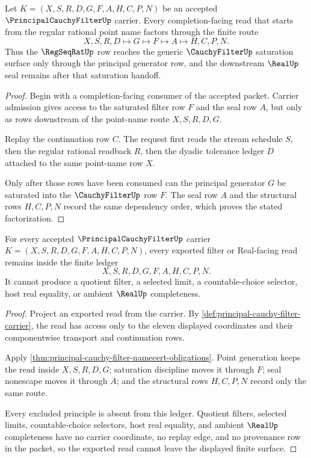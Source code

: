 \begin{theorem}
\label{thm:principal-cauchy-filter-regseqrat-handoff}
Let $K=(X,S,R,D,G,F,A,H,C,P,N)$ be an accepted $\PrincipalCauchyFilterUp$ carrier. Every completion-facing read that starts from the regular rational point name factors through the finite route
$$
X,S,R,D \longmapsto G \longmapsto F \longmapsto A \longmapsto H,C,P,N .
$$
Thus the $\RegSeqRatUp$ row reaches the generic $\CauchyFilterUp$ saturation surface only through the principal generator row, and the downstream $\RealUp$ seal remains after that saturation handoff.
\end{theorem}
\begin{proof}
Begin with a completion-facing consumer of the accepted packet. Carrier admission gives access to the saturated filter row $F$ and the seal row $A$, but only as rows downstream of the point-name route $X,S,R,D,G$.

Replay the continuation row $C$. The request first reads the stream schedule $S$, then the regular rational readback $R$, then the dyadic tolerance ledger $D$ attached to the same point-name row $X$.

Only after those rows have been consumed can the principal generator $G$ be saturated into the $\CauchyFilterUp$ row $F$. The seal row $A$ and the structural rows $H,C,P,N$ record the same dependency order, which proves the stated factorization.
\end{proof}

\begin{theorem}
\label{thm:principal-cauchy-filter-ledger-non-escape}
For every accepted $\PrincipalCauchyFilterUp$ carrier $K=(X,S,R,D,G,F,A,H,C,P,N)$, every exported filter or Real-facing read remains inside the finite ledger
$$
X,S,R,D,G,F,A,H,C,P,N .
$$
It cannot produce a quotient filter, a selected limit, a countable-choice selector, host real equality, or ambient $\RealUp$ completeness.
\end{theorem}
\begin{proof}
Project an exported read from the carrier. By \autoref{def:principal-cauchy-filter-carrier}, the read has access only to the eleven displayed coordinates and their componentwise transport and continuation rows.

Apply \autoref{thm:principal-cauchy-filter-namecert-obligations}. Point generation keeps the read inside $X,S,R,D,G$; saturation discipline moves it through $F$; seal nonescape moves it through $A$; and the structural rows $H,C,P,N$ record only the same route.

Every excluded principle is absent from this ledger. Quotient filters, selected limits, countable-choice selectors, host real equality, and ambient $\RealUp$ completeness have no carrier coordinate, no replay edge, and no provenance row in the packet, so the exported read cannot leave the displayed finite surface.
\end{proof}


